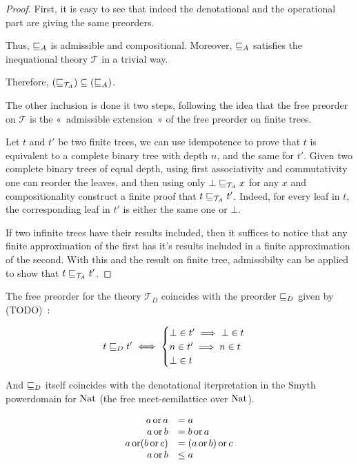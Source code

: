 \begin{proof}
    First, it is easy to see that indeed the denotational
    and the operational part are giving the same preorders.

    Thus, $\sqsubseteq_A$ is admissible and compositional. Moreover,
    $\sqsubseteq_A$ satisfies the inequational 
    theory $\mathcal{T}$ in a trivial way.

    Therefore, $(\sqsubseteq_{\mathcal{T}_A}) \subseteq (\sqsubseteq_A)$.

    The other inclusion is done it two steps, following the 
    idea that the free preorder on $\mathcal{T}$ is
    the «~admissible extension~» of the free preorder on finite 
    trees.
    
    Let $t$ and $t'$ be two finite trees, we can use 
    idempotence to prove that $t$ is equivalent to 
    a complete binary tree with depth $n$, and 
    the same for $t'$. Given two complete binary
    trees of equal depth, using first associativity 
    and commutativity one can reorder the leaves, and 
    then using only $\bot \sqsubseteq_{\mathcal{T}_A} x$ for any
    $x$ and compositionality construct 
    a finite proof that $t \sqsubseteq_{\mathcal{T}_A} t'$.
    Indeed, for every leaf in $t$, the corresponding 
    leaf in $t'$ is either the same one or $\bot$.

    
    If two infinite trees have their results included,
    then it suffices to notice that any finite approximation 
    of the first has it's results included in a finite 
    approximation of the second. With this and the result 
    on finite tree, admissibilty can be applied to 
    show that $t \sqsubseteq_{\mathcal{T}_A} t'$. 
\end{proof}


\begin{alemma}
    The free preorder for the theory $\mathcal{T}_D$ coincides with 
    the preorder $\sqsubseteq_D$ given by (TODO)~:

    \begin{equation*}
        t \sqsubseteq_D t' \iff 
        \begin{cases}
            \bot \in t' \implies \bot \in t \\
            n    \in t' \implies n \in t    \\
            \bot \in t
        \end{cases}
    \end{equation*}

    And $\sqsubseteq_D$ itself coincides with the denotational
    iterpretation in the Smyth powerdomain for $\textnormal{Nat}$
    (the free meet-semilattice over $\textnormal{Nat}$).

    \begin{equation*}
        \begin{array}{rl}
            a \operatorname{or} a &= a \\
            a \operatorname{or} b &= b \operatorname{or} a \\
            a \operatorname{or} (b \operatorname{or} c) &= (a \operatorname{or} b) \operatorname{or} c \\
            a \operatorname{or} b &\leq a
        \end{array}
    \end{equation*}
\end{alemma}

